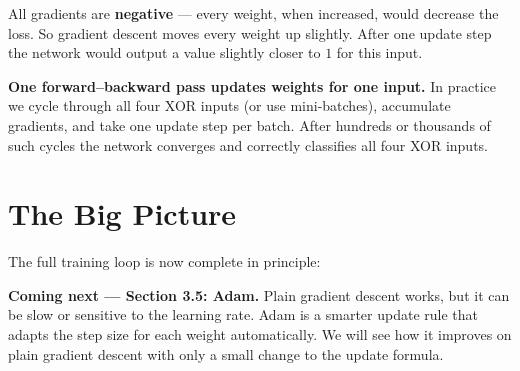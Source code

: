 \documentclass[12pt, a4paper]{article}
\theoremstyle{definition}
\newcommand{\yhat}{\hat{y}}
\begin{document}
\vspace{0.5em}

All gradients are \textbf{negative} --- every weight, when increased, would
decrease the loss.
So gradient descent moves every weight up slightly.
After one update step the network would output a value slightly closer to $1$
for this input.

\begin{warnbox}
\textbf{One forward--backward pass updates weights for one input.}
In practice we cycle through all four XOR inputs (or use mini-batches),
accumulate gradients, and take one update step per batch.
After hundreds or thousands of such cycles the network converges and
correctly classifies all four XOR inputs.
\end{warnbox}

\section{The Big Picture}

The full training loop is now complete in principle:

\begin{center}
\end{center}

\vspace{0.5em}

\begin{notebox}
\textbf{Coming next --- Section 3.5: Adam.}
Plain gradient descent works, but it can be slow or sensitive to the
learning rate.  Adam is a smarter update rule that adapts the step size for
each weight automatically.  We will see how it improves on plain gradient
descent with only a small change to the update formula.
\end{notebox}
\end{document}
